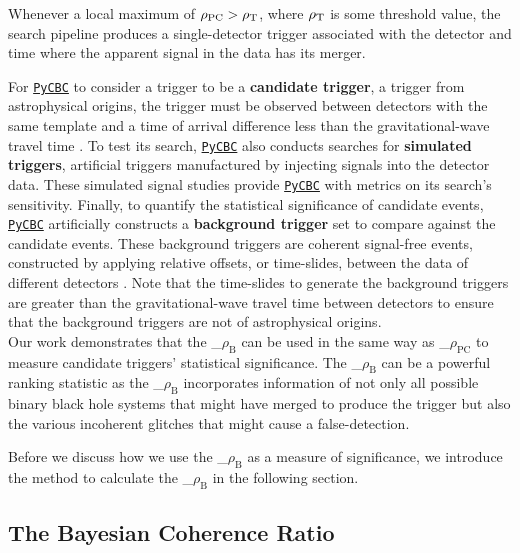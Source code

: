 \documentclass[%
 amsmath,amssymb,
 aps,
twocolumn
]{revtex4}
\newcommand{\pycbc}{{\sc \href{https://pycbc.org/}{\texttt{PyCBC}}}\xspace}
\newcommand{\mathcmd}[1]{{\sc \relax\ifmmode#1\else $#1$\fi}\xspace}
\newcommand{\bcr}{\mathcmd{\rho_\text{B}}}
\newcommand{\pycbcstat}{\mathcmd{\rho_\text{PC}}}
\newcommand{\snr}{\mathcmd{\rho}}
\begin{document}
Whenever a local maximum of $\pycbcstat > \snr_\text{T}$, where $\snr_\text{T}$ is some threshold value, the search pipeline produces a single-detector trigger associated with the detector and time where the apparent signal in the data has its merger.

For \pycbc to consider a trigger to be a \textbf{candidate trigger}, a trigger from astrophysical origins, the trigger must be observed between detectors with the same template and a time of arrival difference less than the gravitational-wave travel time \cite{pycbc_og6}. To test its search, \pycbc also conducts searches for \textbf{simulated triggers}, artificial triggers manufactured by injecting signals into the detector data. These simulated signal studies provide \pycbc with metrics on its search's sensitivity. Finally, to quantify the statistical significance of candidate events, \pycbc artificially constructs a \textbf{background trigger} set to compare against the candidate events. These background triggers are coherent signal-free events, constructed by applying relative offsets, or time-slides, between the data of different detectors \cite{pycbc_og6}. Note that the time-slides to generate the background triggers are greater than the gravitational-wave travel time between detectors to ensure that the background triggers are not of astrophysical origins. \\

Our work demonstrates that the \bcr can be used in the same way as \pycbcstat to measure candidate triggers' statistical significance.  The \bcr can be a powerful ranking statistic as the \bcr incorporates information of not only all possible binary black hole systems that might have merged to produce the trigger but also the various incoherent glitches that might cause a false-detection. 

Before we discuss how we use the \bcr as a measure of significance, we introduce the method to calculate the \bcr in the following section.


\subsection{The Bayesian Coherence Ratio}
\end{document}
